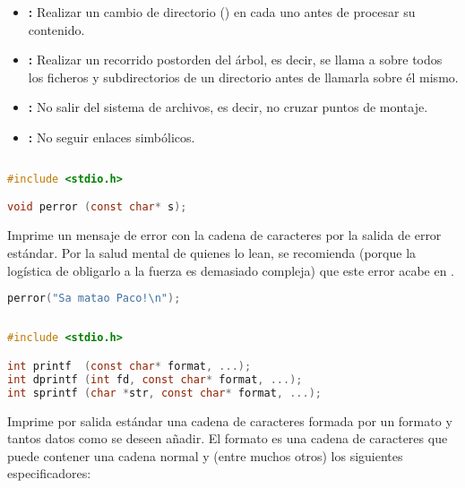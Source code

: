 \begin{itemize}
	\item{}\textbf{:} Realizar un cambio de directorio () en cada uno antes de procesar su contenido.
	\item{}\textbf{:} Realizar un recorrido postorden del árbol, es decir, se llama a  sobre todos los ficheros y subdirectorios de un directorio antes de llamarla sobre él mismo.
	\item{}\textbf{:} No salir del sistema de archivos, es decir, no cruzar puntos de montaje.
	\item{}\textbf{:} No seguir enlaces simbólicos.
\end{itemize}

\subsection{}

\begin{lstlisting}[language=C]
#include <stdio.h>

void perror (const char* s);
\end{lstlisting}

Imprime un mensaje de error con la cadena de caracteres  por la salida de error estándar.
Por la salud mental de quienes lo lean, se recomienda (porque la logística de obligarlo a la fuerza es demasiado compleja) que este error acabe en .

\begin{lstlisting}[language=C]
perror("Sa matao Paco!\n");
\end{lstlisting}

\subsection{}

\begin{lstlisting}[language=C]
#include <stdio.h>

int printf  (const char* format, ...);
int dprintf (int fd, const char* format, ...);
int sprintf (char *str, const char* format, ...);
\end{lstlisting}

Imprime por salida estándar una cadena de caracteres formada por un formato  y tantos datos como se deseen añadir.
El formato es una cadena de caracteres que puede contener una cadena normal y (entre muchos otros) los siguientes especificadores:

